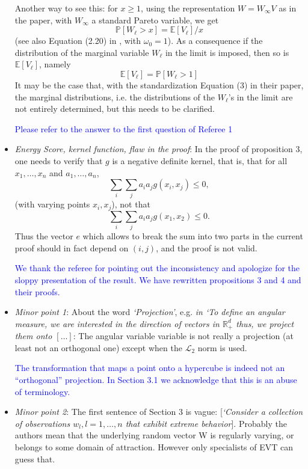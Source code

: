 \documentclass[10pt]{article}
\newcommand{\response}[1]{\textcolor{blue}{#1}}
\begin{document}
\begin{itemize}
    Another way to see this: for $x \geq 1$, using the representation $W = W_{\infty}V$ as in the
    paper, with $W_{\infty}$ a standard Pareto variable, we get 
    \[\mathbb{P}\left[W_{\ell} > x\right] = \mathbb{E}\left[V_{\ell}\right] / x\]
    (see also Equation (2.20) in \cite{ferreira2014}, with $\omega_0 = 1$).  As a consequence if 
    the distribution of the marginal variable $W_{\ell}$ in the limit is imposed, then so is 
    $\mathbb{E}\left[V_{\ell}\right]$, namely 
    \[ \mathbb{E}\left[V_{\ell}\right] = \mathbb{P}\left[W_{\ell} > 1\right] \]
    It may be the case that, with the standardization Equation (3) in their paper, the marginal
    distributions, i.e. the distributions of the $W_{\ell}$’s in the limit are not entirely determined, 
    but this needs to be clarified.

\response{Please refer to the answer to the first question of Referee 1}

    \item \emph{Energy Score, kernel function, flaw in the proof}: In the proof of proposition 3, 
    one needs to verify that $g$ is a negative definite kernel, that is, that for all $x_1,\ldots,x_n$
    and $a_1,\ldots,a_n$, \[ \sum_i\sum_ja_ia_jg(x_i,x_j)\leq 0,\]
    (with varying points $x_i,x_j$), not that \[\sum_i\sum_ja_ia_jg(x_1,x_2)\leq 0.\]  Thus the vector $e$
    which allows to break the sum into two parts in the current proof should in fact depend on $(i,j)$, 
    and the proof is not valid.

\response{We thank the referee for pointing out the inconsistency and apologize for the sloppy presentation 
    of the result. We have rewritten propositions 3 and 4 and their proofs.
    }

    \item \emph{Minor point 1}: About the word \emph{‘Projection’}, e.g. \emph{in 
    ‘To define an angular measure, we are interested in the direction of vectors in $\mathbb{R}_+^d$
    thus, we project them onto $[\ldots]$}: The angular variable variable is not really a projection 
    (at least not an orthogonal one) except when the $\mathcal{L}_2$ norm is used.

\response{The transformation that maps a point onto a hypercube is indeed not an ``orthogonal'' projection. 
    In Section 3.1 we acknowledge that this is an abuse of terminology. 
    }

    \item \emph{Minor point 2}: The first sentence of Section 3 is vague: [\emph{‘Consider a 
    collection of observations $w_l, l = 1,\ldots,n$ that exhibit extreme behavior}].  Probably the
    authors mean that the underlying random vector W is regularly varying, or belongs to some domain 
    of attraction. However only specialists of EVT can guess that.


\end{itemize}
\end{document}
